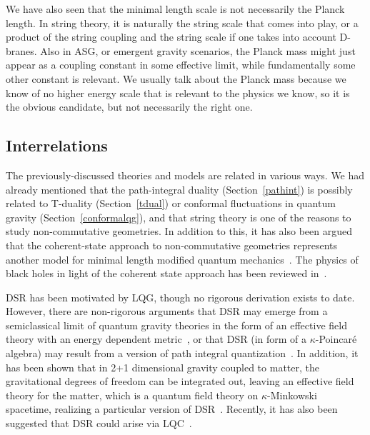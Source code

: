 \documentclass{article}
\begin{document}
We have also seen that the minimal length scale is not necessarily the Planck length. 
In string theory, it is naturally
the string scale that comes into play, or a product of the string coupling and the string
scale if one takes into account D-branes. Also in {\sc ASG}, or emergent gravity
scenarios, the Planck mass might just appear as a coupling constant in some effective
limit, while fundamentally some other constant is relevant. We usually talk
about the Planck mass because we know of no higher energy scale that is relevant to
the physics we know, so it is the obvious candidate, but not
necessarily the right one.

\subsection{Interrelations}

The previously-discussed theories and models are related in various ways. We had already
mentioned that the path-integral duality (Section~\ref{pathint}) is possibly related to T-duality (Section~\ref{tdual}) 
or conformal fluctuations in quantum gravity (Section~\ref{conformalqg}), and that string theory is one of 
the reasons to study non-commutative geometries. 
In addition to this, it has also been argued that the coherent-state approach to non-commutative geometries 
represents another model for minimal length modified quantum mechanics~\cite{Sprenger:2012uc}. The
physics of black holes in light of the coherent state approach has been reviewed in~\cite{Nicolini:2008aj}.

{\sc DSR} has been motivated by {\sc LQG}, though no rigorous derivation exists to
date. However, there are non-rigorous arguments that {\sc DSR} may emerge from a semiclassical limit 
of quantum gravity theories in the form of an effective field theory with  an energy dependent metric~\cite{AmelinoCamelia:2003xp},
or that {\sc DSR} (in form of a $\kappa$-Poincar\'e algebra) may result from a version of path integral 
quantization~\cite{KowalskiGlikman:2008fj}. In addition, it has been shown that
 in 2+1 dimensional gravity coupled to matter, the gravitational degrees of freedom can be integrated out, leaving 
an effective field theory for the matter, which is a quantum field theory on $\kappa$-Minkowski spacetime, realizing
a particular version of {\sc DSR}~\cite{Freidel:2003sp}. Recently, it has also been suggested that
{\sc DSR} could arise via {\sc LQC}~\cite{Bojowald:2009ey}. 
\end{document}
